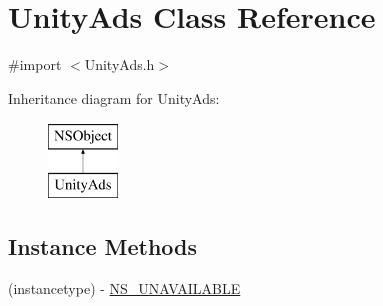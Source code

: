 \hypertarget{interface_unity_ads}{}\section{Unity\+Ads Class Reference}
\label{interface_unity_ads}


{\ttfamily \#import $<$Unity\+Ads.\+h$>$}

Inheritance diagram for Unity\+Ads\+:\begin{figure}[H]
\begin{center}
\leavevmode
\includegraphics[height=2.000000cm]{interface_unity_ads}
\end{center}
\end{figure}
\subsection*{Instance Methods}
\begin{DoxyCompactItemize}
\item 
(instancetype) -\/ \mbox{\hyperlink{interface_unity_ads_a5e5d2f9d0967ae24896451e0fa1d7d05}{N\+S\+\_\+\+U\+N\+A\+V\+A\+I\+L\+A\+B\+LE}}
\end{DoxyCompactItemize}
